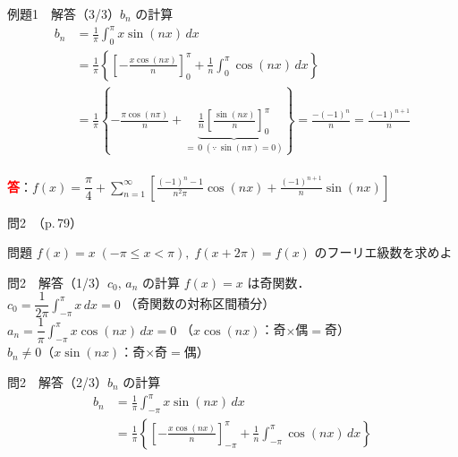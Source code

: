 \documentclass[professionalfonts]{beamer}
\begin{document}
\begin{frame}{例題1　解答（3/3）$b_{n}$ の計算}
  \begin{align*}
    b_{n} &= \frac{1}{\pi}\int_{0}^{\pi} x\sin(nx)\,dx \\[4pt]
    &= \frac{1}{\pi}\left\{\left[-\frac{x\cos(nx)}{n}\right]_{0}^{\pi} + \frac{1}{n}\int_{0}^{\pi}\cos(nx)\,dx\right\} \\[4pt]
    &= \frac{1}{\pi}\left\{-\frac{\pi\cos(n\pi)}{n} + \underbrace{\frac{1}{n}\left[\frac{\sin(nx)}{n}\right]_{0}^{\pi}}_{=\,0\;(\because\,\sin(n\pi)=0)}\right\}
     = \frac{-(-1)^{n}}{n}
     = \frac{(-1)^{n+1}}{n}
  \end{align*}
  \\[8pt]\textcolor{red}{\textbf{答}}：$f(x) = \dfrac{\pi}{4} + \displaystyle\sum_{n=1}^{\infty}\left[\frac{(-1)^{n}-1}{n^{2}\pi}\cos(nx) + \frac{(-1)^{n+1}}{n}\sin(nx)\right]$
\end{frame}

\begin{frame}{問2　（p.\,79）}
  \begin{exampleblock}{問題}
    $f(x) = x \;(-\pi \leq x < \pi),\; f(x+2\pi) = f(x)$ のフーリエ級数を求めよ\\[2pt]
  \end{exampleblock}
\end{frame}

\begin{frame}{問2　解答（1/3）$c_{0},\,a_{n}$ の計算}
  $f(x) = x$ は奇関数．\\[4pt]
  $c_{0} = \dfrac{1}{2\pi}\displaystyle\int_{-\pi}^{\pi} x\,dx = 0$
  \quad（奇関数の対称区間積分）\\[6pt]
  $a_{n} = \dfrac{1}{\pi}\displaystyle\int_{-\pi}^{\pi} x\cos(nx)\,dx = 0$
  \quad（$x\cos(nx)$：奇$\times$偶$=$奇）\\[6pt]
  $b_{n} \neq 0$\quad（$x\sin(nx)$：奇$\times$奇$=$偶）
\end{frame}

\begin{frame}{問2　解答（2/3）$b_{n}$ の計算}
  \begin{align*}
    b_{n} &= \frac{1}{\pi}\int_{-\pi}^{\pi} x \sin(nx)\,dx \\[4pt]
    &= \frac{1}{\pi}\left\{\left[-\frac{x\cos(nx)}{n}\right]_{-\pi}^{\pi} + \frac{1}{n}\int_{-\pi}^{\pi}\cos(nx)\,dx\right\}
  \end{align*}
\end{frame}
\end{document}

